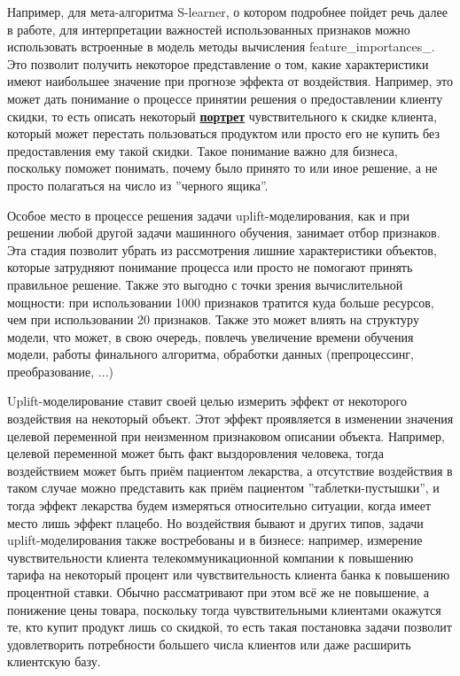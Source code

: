 \iffalse
 
 
 Например, для мета-алгоритма S-learner, о котором подробнее пойдет речь далее в работе, для интерпретации важностей использованных признаков можно использовать встроенные в модель методы вычисления feature\_importances\_. Это позволит получить некоторое представление о том, какие характеристики имеют наибольшее значение при прогнозе эффекта от воздействия. Например, это может дать понимание о процессе принятии решения о предоставлении клиенту скидки, то есть описать некоторый \textbf{\underline{портрет}} чувствительного к скидке клиента, который может перестать пользоваться продуктом или просто его не купить без предоставления ему такой скидки. Такое понимание важно для бизнеса, поскольку поможет понимать, почему было принято то или иное решение, а не просто полагаться на число из ''черного ящика''.

\par
Особое место в процессе решения задачи uplift-моделирования, как и при решении любой другой задачи машинного обучения, занимает отбор признаков. Эта стадия позволит убрать из рассмотрения лишние характеристики объектов, которые затрудняют понимание процесса или просто не помогают принять правильное решение. Также это выгодно с точки зрения вычислительной мощности: при использовании 1000 признаков тратится куда больше ресурсов, чем при использовании 20 признаков. Также это может влиять на структуру модели, что может, в свою очередь, повлечь увеличение времени обучения модели, работы финального алгоритма, обработки данных (препроцессинг, преобразование, ...)




\par
Uplift-моделирование ставит своей целью измерить эффект от некоторого воздействия на некоторый объект. Этот эффект проявляется в изменении значения целевой переменной при неизменном признаковом описании объекта. Например, целевой переменной может быть факт выздоровления человека, тогда воздействием может быть приём пациентом лекарства, а отсутствие воздействия в таком случае можно представить как приём пациентом ''таблетки-пустышки'', и тогда эффект лекарства будем измеряться относительно ситуации, когда имеет место лишь эффект плацебо. Но воздействия бывают и других типов, задачи uplift-моделирования также востребованы и в бизнесе: например, измерение чувствительности клиента телекоммуникационной компании к повышению тарифа на некоторый процент или чувствительность клиента банка к повышению процентной ставки. Обычно рассматривают при этом всё же не повышение, а понижение цены товара, поскольку тогда чувствительными клиентами окажутся те, кто купит продукт лишь со скидкой, то есть такая постановка задачи позволит удовлетворить потребности большего числа клиентов или даже расширить клиентскую базу.

